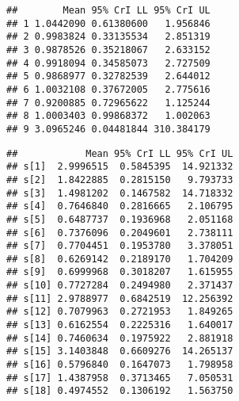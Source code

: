\documentclass[]{article}
\newenvironment{Shaded}{\begin{snugshade}}{\end{snugshade}}
\newcommand{\CommentTok}[1]{\textcolor[rgb]{0.56,0.35,0.01}{\textit{#1}}}
\newcommand{\ControlFlowTok}[1]{\textcolor[rgb]{0.13,0.29,0.53}{\textbf{#1}}}
\newcommand{\DataTypeTok}[1]{\textcolor[rgb]{0.13,0.29,0.53}{#1}}
\newcommand{\DecValTok}[1]{\textcolor[rgb]{0.00,0.00,0.81}{#1}}
\newcommand{\FloatTok}[1]{\textcolor[rgb]{0.00,0.00,0.81}{#1}}
\newcommand{\KeywordTok}[1]{\textcolor[rgb]{0.13,0.29,0.53}{\textbf{#1}}}
\newcommand{\NormalTok}[1]{#1}
\newcommand{\OperatorTok}[1]{\textcolor[rgb]{0.81,0.36,0.00}{\textbf{#1}}}
\newcommand{\StringTok}[1]{\textcolor[rgb]{0.31,0.60,0.02}{#1}}
\begin{document}
\begin{verbatim}
##        Mean 95% CrI LL 95% CrI UL
## 1 1.0442090 0.61380600   1.956846
## 2 0.9983824 0.33135534   2.851319
## 3 0.9878526 0.35218067   2.633152
## 4 0.9918094 0.34585073   2.727509
## 5 0.9868977 0.32782539   2.644012
## 6 1.0032108 0.37672005   2.775616
## 7 0.9200885 0.72965622   1.125244
## 8 1.0003403 0.99868372   1.002063
## 9 3.0965246 0.04481844 310.384179
\end{verbatim}

\begin{Shaded}
\end{Shaded}

\begin{verbatim}
##            Mean 95% CrI LL 95% CrI UL
## s[1]  2.9996515  0.5845395  14.921332
## s[2]  1.8422885  0.2815150   9.793733
## s[3]  1.4981202  0.1467582  14.718332
## s[4]  0.7646840  0.2816665   2.106795
## s[5]  0.6487737  0.1936968   2.051168
## s[6]  0.7376096  0.2049601   2.738111
## s[7]  0.7704451  0.1953780   3.378051
## s[8]  0.6269142  0.2189170   1.704209
## s[9]  0.6999968  0.3018207   1.615955
## s[10] 0.7727284  0.2494980   2.371437
## s[11] 2.9788977  0.6842519  12.256392
## s[12] 0.7079963  0.2721953   1.849265
## s[13] 0.6162554  0.2225316   1.640017
## s[14] 0.7460634  0.1975922   2.881918
## s[15] 3.1403848  0.6609276  14.265137
## s[16] 0.5796840  0.1647073   1.798958
## s[17] 1.4387958  0.3713465   7.050531
## s[18] 0.4974552  0.1306192   1.563750
\end{verbatim}
\end{document}
